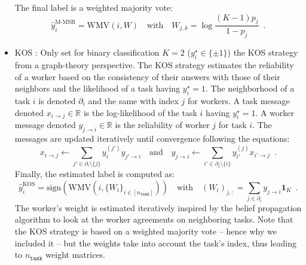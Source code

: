 \documentclass{cap2024}
\begin{document}
\begin{itemize}
  The final label is a weighted majority vote:
  \begin{equation}
    \hat y_i^{\text{M-MSR}} = \mathrm{WMV}(i, W)\quad \text{with}\quad W_{j,k}=\log\frac{(K-1)p_j}{1-p_j}\enspace.
  \end{equation}

  \item KOS \citep{karger2011iterative}: Only set for binary classification $K=2$ ($y_i^\star\in\{\pm 1\}$) the KOS strategy from a graph-theory perspective.
  The KOS strategy estimates the reliability of a worker based on the consistency of their answers with those of their neighbors and the likelihood of a task having $y_i^\star=1$.
  The neighborhood of a task $i$ is denoted $\partial_i$ and the same with index $j$ for workers. A task message denoted $x_{i\rightarrow j}\in\mathbb{R}$ is the log-likelihood of the task $i$ having $y_i^\star=1$.
  A worker message denoted $y_{j\rightarrow i}\in\mathbb{R}$ is the reliability of worker $j$ for task $i$.
  The messages are updated iteratively until convergence following the equations:
  \begin{equation*}
      x_{i\rightarrow j} \gets \sum_{j'\in \partial_i\setminus \{j\}} y_i^{(j')}y_{j'\rightarrow i} \quad \text{and}\quad y_{j\rightarrow i} \gets \sum_{i'\in \partial_j\setminus \{i\}} y_{i'}^{(j)} x_{i'\rightarrow j} \enspace.
  \end{equation*}
  Finally, the estimated label is computed as:
  \begin{equation}
    \hat y_i^{\text{KOS}} = \mathrm{sign}\left(\mathrm{WMV}(i, \{W_i\}_{i\in [n_\texttt{task}]} )\right)\quad \text{with}\quad (W_i)_{j,:}=\sum_{j\in\partial_i}y_{j\rightarrow i}\mathbf{1}_{K}\enspace.
  \end{equation}
  The worker's weight is estimated iteratively inspired by the belief propagation algorithm to look at the worker agreements on neighboring tasks.
  Note that the KOS strategy is based on a weighted majority vote -- hence why we included it -- but the weights take into account the task's index, thus leading to $n_\texttt{task}$ weight matrices.

\end{itemize}
\end{document}
